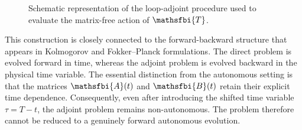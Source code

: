 \begin{appendices}
\begin{figure}
  \caption{Schematic representation of the loop-adjoint procedure used to evaluate the matrix-free action of \(\mathsfbi{T}\).}
  \label{fig:loop-adjoint}
\end{figure}
This construction is closely connected to the forward-backward structure that appears in Kolmogorov and Fokker--Planck formulations. The direct problem is evolved forward in time, whereas the adjoint problem is evolved backward in the physical time variable. The essential distinction from the autonomous setting is that the matrices \(\mathsfbi{A}(t)\) and \(\mathsfbi{B}(t)\) retain their explicit time dependence. Consequently, even after introducing the shifted time variable \(\tau=T-t\), the adjoint problem remains non-autonomous. The problem therefore cannot be reduced to a genuinely forward autonomous evolution.


\end{appendices}
